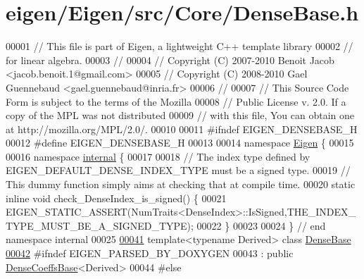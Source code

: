 \hypertarget{eigen_2_eigen_2src_2_core_2_dense_base_8h_source}{}\section{eigen/\+Eigen/src/\+Core/\+Dense\+Base.h}
\label{eigen_2_eigen_2src_2_core_2_dense_base_8h_source}

\begin{DoxyCode}
00001 \textcolor{comment}{// This file is part of Eigen, a lightweight C++ template library}
00002 \textcolor{comment}{// for linear algebra.}
00003 \textcolor{comment}{//}
00004 \textcolor{comment}{// Copyright (C) 2007-2010 Benoit Jacob <jacob.benoit.1@gmail.com>}
00005 \textcolor{comment}{// Copyright (C) 2008-2010 Gael Guennebaud <gael.guennebaud@inria.fr>}
00006 \textcolor{comment}{//}
00007 \textcolor{comment}{// This Source Code Form is subject to the terms of the Mozilla}
00008 \textcolor{comment}{// Public License v. 2.0. If a copy of the MPL was not distributed}
00009 \textcolor{comment}{// with this file, You can obtain one at http://mozilla.org/MPL/2.0/.}
00010 
00011 \textcolor{preprocessor}{#ifndef EIGEN\_DENSEBASE\_H}
00012 \textcolor{preprocessor}{#define EIGEN\_DENSEBASE\_H}
00013 
00014 \textcolor{keyword}{namespace }\hyperlink{namespace_eigen}{Eigen} \{
00015 
00016 \textcolor{keyword}{namespace }\hyperlink{namespaceinternal}{internal} \{
00017   
00018 \textcolor{comment}{// The index type defined by EIGEN\_DEFAULT\_DENSE\_INDEX\_TYPE must be a signed type.}
00019 \textcolor{comment}{// This dummy function simply aims at checking that at compile time.}
00020 \textcolor{keyword}{static} \textcolor{keyword}{inline} \textcolor{keywordtype}{void} check\_DenseIndex\_is\_signed() \{
00021   EIGEN\_STATIC\_ASSERT(NumTraits<DenseIndex>::IsSigned,THE\_INDEX\_TYPE\_MUST\_BE\_A\_SIGNED\_TYPE); 
00022 \}
00023 
00024 \} \textcolor{comment}{// end namespace internal}
00025   
\hyperlink{struct_eigen_1_1_dense_base_1_1_fixed_segment_return_type}{00041} \textcolor{keyword}{template}<\textcolor{keyword}{typename} Derived> \textcolor{keyword}{class }\hyperlink{group___core___module_class_eigen_1_1_dense_base}{DenseBase}
\hyperlink{struct_eigen_1_1_dense_base_1_1_const_fixed_segment_return_type}{00042} #ifndef EIGEN\_PARSED\_BY\_DOXYGEN
00043   : \textcolor{keyword}{public} \hyperlink{class_eigen_1_1_dense_coeffs_base}{DenseCoeffsBase}<Derived>
00044 \textcolor{preprocessor}{#else}

\end{DoxyCode}
